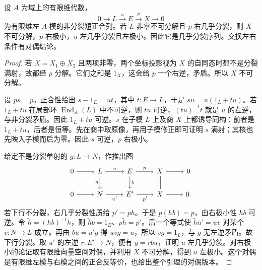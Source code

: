 \begin{lemma}\label{b5:lem:almost-split-one-sided}
	设 \(A\) 为域上的有限维代数，
	\[
		0\longrightarrow L\xrightarrow{u}E\xrightarrow{p}X\longrightarrow0
	\]
	为有限维左 \(A\)-模的非分裂短正合列。若 \(L\) 非零不可分解且 \(p\) 右几乎分裂，则 \(X\) 不可分解，\(p\) 右极小，\(u\) 左几乎分裂且左极小。因此它是几乎分裂序列。交换左右条件有对偶结论。
\end{lemma}
\begin{proof}
	若 \(X=X_1\oplus X_2\) 且两项非零，两个坐标投影视为 \(X\) 的自同态时都不是分裂满射，故都经 \(p\) 分解。它们之和是 \(1_X\)，这会给 \(p\) 一个右逆，矛盾。所以 \(X\) 不可分解。

	设 \(ps=p\)。正合性给出 \(s-1_E=ut\)，其中 \(t:E\to L\)，于是 \(su=u(1_L+tu)\)。若 \(1_L+tu\) 在局部环 \(\operatorname{End}_A(L)\) 中不可逆，则 \(tu\) 可逆，\((tu)^{-1}t\) 就是 \(u\) 的左逆，与非分裂矛盾。因此 \(1_L+tu\) 可逆。\(s\) 在子模 \(L\) 上及商 \(X\) 上都诱导同构：前者是 \(1_L+tu\)，后者是恒等。先在商中取原像，再用子模修正即可证明 \(s\) 满射；其核也先映入子模而后为零。因此 \(s\) 可逆，\(p\) 右极小。

	给定不是分裂单射的 \(g:L\to N\)，作推出图
	\[
		\begin{tikzcd}
			0\arrow[r]&L\arrow[r,"u"]\arrow[d,"g"']&E\arrow[r,"p"]\arrow[d,"b"]&X\arrow[r]\arrow[d,equal]&0\\
			0\arrow[r]&N\arrow[r,"u'"']&E'\arrow[r,"p'"']&X\arrow[r]&0.
		\end{tikzcd}
	\]
	若下行不分裂，右几乎分裂性质给 \(p'=ph\)。于是 \(p(hb)=p\)，由右极小性 \(hb\) 可逆。令 \(\widetilde h=(hb)^{-1}h\)，则 \(\widetilde h b=1_E\)、\(p\widetilde h=p'\)。后一个等式使 \(\widetilde h u'=uv\) 对某个 \(v:N\to L\) 成立。再由 \(bu=u'g\) 得 \(uvg=u\)，所以 \(vg=1_L\)，与 \(g\) 无左逆矛盾。故下行分裂。取 \(u'\) 的左逆 \(r:E'\to N\)，便有 \(g=rbu\)，证明 \(u\) 左几乎分裂。对右极小的论证取有限维向量空间对偶，并利用 \(X\) 不可分解，得到 \(u\) 左极小。这个对偶是有限维左模与右模之间的正合反等价，也给出整个引理的对偶版本。
\end{proof}

